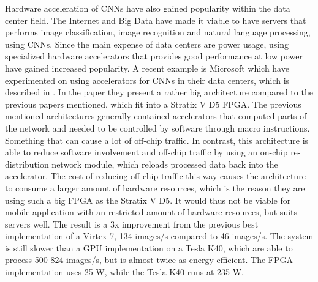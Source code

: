 Hardware acceleration of CNNs have also gained popularity within the data center field. The Internet and Big Data have made it viable to have servers that performs image classification, image recognition and natural language processing, using CNNs. Since the main expense of data centers are power usage, using specialized hardware accelerators that provides good performance at low power have gained increased popularity. A recent example is Microsoft which have experimented on using accelerators for CNNs in their data centers, which is described in \cite{Microsoft_paper}. In the paper they present a rather big architecture compared to the previous papers mentioned, which fit into a Stratix V D5 FPGA. The previous mentioned architectures generally contained accelerators that computed parts of the network and needed to be controlled by software through macro instructions. Something that can cause a lot of off-chip traffic. In contrast, this architecture is able to reduce software involvement and off-chip traffic by using an on-chip re-distribution network module, which reloads processed data back into the accelerator. The cost of reducing off-chip traffic this way causes the architecture to consume a larger amount of hardware resources, which is the reason they are using such a big FPGA as the Stratix V D5. It would thus not be viable for mobile application with an restricted amount of hardware resources, but suits servers well. The result is a 3x improvement from the previous best implementation of a Virtex 7, 134 images/s compared to 46 images/s. The system is still slower than a GPU implementation on a Tesla K40, which are able to process 500-824 images/s, but is almost twice as energy efficient. The FPGA implementation uses 25 W, while the Tesla K40 runs at 235 W. 

